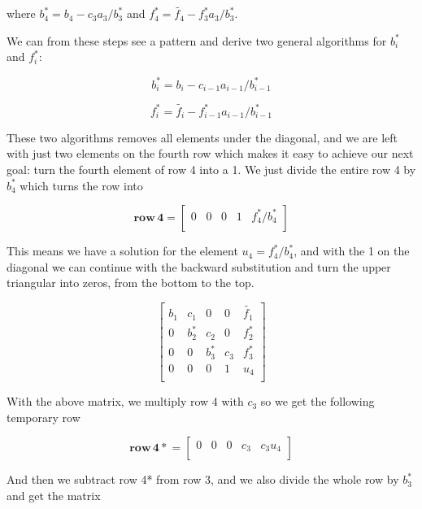 \documentclass[oneside, final, 11pt, english, twocolumn]{article}
\begin{document}
where $b_4^* = b_4 - c_3 a_3/b_3^*$ and $f^*_4 = \tilde{f_4} - f_3^* a_3 /b_3^*$. 

We can from these steps see a pattern and derive two general algorithms for $b_i^*$ and $f^*_i$: 


\begin{equation}
b_i^* = b_i - c_{i-1}a_{i-1}/b_{i-1}^*
\end{equation}

\begin{equation}
f^*_i = \tilde{f_i} - f_{i-1}^* a_{i-1} /b_{i-1}^*
\end{equation}

These two algorithms removes all elements under the diagonal, and we are left with just two elements on the fourth row which makes it easy to achieve our next goal: turn the fourth element of row 4 into a 1. We just divide the entire row 4 by $b_4^*$ which turns the row into

\[
\mathbf{row \, 4} = 
\left[ {\begin{array}{ccc}
0  \, \, \, \, \, 
0 \, \, \, \, \, 
0\, \, \, \, \, 
1\, \, \, \, \, 
f_4^*/b_4^* \\
\end{array} } \right]
\]

This means we have a solution for the element $u_4 = f_4^*/b_4^*$, and with the 1 on the diagonal we can continue with the backward substitution and turn the upper triangular into zeros, from the bottom to the top. 

\[
    \begin{bmatrix}
                           b_1& c_1 & 0 &0 & \tilde{f_1}\\
                           0 & b^*_2 & c_2 &0 & f^*_2\\
                           0&0 &b_3^* & c_3 & f_3^*\\
                           0&0 & 0 & 1 & u_4\\
                      \end{bmatrix}
\]

With the above matrix, we multiply row 4 with $c_3$ so we get the following temporary row 

\[
\mathbf{row \, 4*} = 
\left[ {\begin{array}{ccc}
0  \, \, \, \, \, 
0 \, \, \, \, \, 
0\, \, \, \, \, 
c_3\, \, \, \, \, 
c_3 u_4 \\
\end{array} } \right]
\]

And then we subtract row 4* from row 3, and we also divide the whole row by $b_3^*$ and get the matrix
\end{document}
